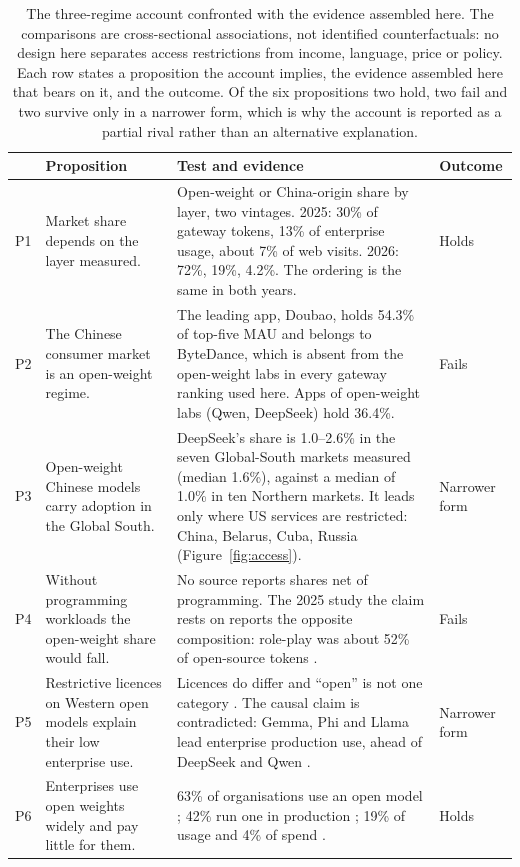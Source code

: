 \documentclass[11pt]{article}
\begin{document}
\begin{table}[t]
\centering\footnotesize
\caption{The three-regime account confronted with the evidence assembled here. The comparisons are cross-sectional associations, not identified counterfactuals: no design here separates access restrictions from income, language, price or policy. Each row states a proposition the account implies, the evidence assembled here that bears on it, and the outcome. Of the six propositions two hold, two fail and two survive only in a narrower form, which is why the account is reported as a partial rival rather than an alternative explanation.}
\label{tab:rival}
\begin{tabularx}{\textwidth}{@{}l L{4.3cm} X l@{}}
\toprule
& Proposition & Test and evidence & Outcome \\
\midrule
P1 & Market share depends on the layer measured. & Open-weight or China-origin share by layer, two vintages. 2025: 30\% of gateway tokens, 13\% of enterprise usage, about 7\% of web visits. 2026: 72\%, 19\%, 4.2\%. The ordering is the same in both years. & Holds \\
P2 & The Chinese consumer market is an open-weight regime. & The leading app, Doubao, holds 54.3\% of top-five MAU and belongs to ByteDance, which is absent from the open-weight labs in every gateway ranking used here. Apps of open-weight labs (Qwen, DeepSeek) hold 36.4\%. & Fails \\
P3 & Open-weight Chinese models carry adoption in the Global South. & DeepSeek's share is 1.0--2.6\% in the seven Global-South markets measured (median 1.6\%), against a median of 1.0\% in ten Northern markets. It leads only where US services are restricted: China, Belarus, Cuba, Russia (Figure~\ref{fig:access}). & Narrower form \\
P4 & Without programming workloads the open-weight share would fall. & No source reports shares net of programming. The 2025 study the claim rests on reports the opposite composition: role-play was about 52\% of open-source tokens \cite{aubakirova2026state}. & Fails \\
P5 & Restrictive licences on Western open models explain their low enterprise use. & Licences do differ and ``open'' is not one category \cite{schrepel2025measuring,duan2025position}. The causal claim is contradicted: Gemma, Phi and Llama lead enterprise production use, ahead of DeepSeek and Qwen \cite{futurum2026open}. & Narrower form \\
P6 & Enterprises use open weights widely and pay little for them. & 63\% of organisations use an open model \cite{mckinsey2025open}; 42\% run one in production \cite{futurum2026open}; 19\% of usage and 4\% of spend \cite{menlo2026state}. & Holds \\
\bottomrule
\end{tabularx}
\end{table}
\end{document}

